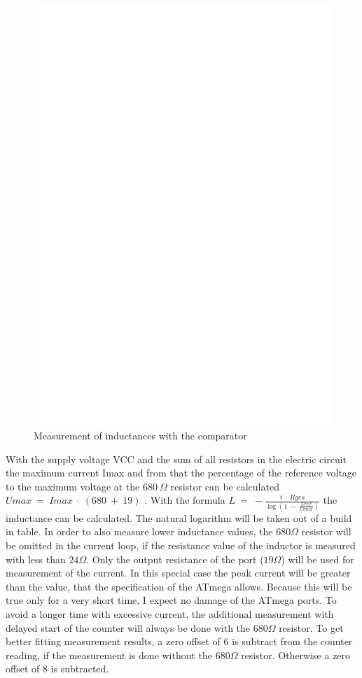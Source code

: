 \begin{figure}[H]
\centering
\includegraphics[]{../FIG/Inductance.eps}
\caption{Measurement of inductances with the comparator}
\label{fig:Inductance}
\end{figure}

With the supply voltage VCC and the sum of all resistors in the electric circuit the maximum current Imax and from
that the percentage of the reference voltage to the maximum voltage at the \(680~\Omega\) resistor can be calculated
\(Umax~=~Imax~\cdot~(680~+~19)\) .
With the formula \(L~=~-\frac{t~\cdot~Rges}{\log{(1~-~\frac{Uref}{Umax})}}\) the inductance can be calculated.
The natural logarithm will be taken out of a build in table.
In order to also measure lower inductance values, the \(680 \Omega\) resistor will be omitted in the current loop,
if the resistance value of the inductor is measured with less than \(24 \Omega\).
Only the output resistance of the port (\(19 \Omega\)) will be used for measurement of the current.
In this special case the peak current will be greater than the value, that the specification of the ATmega allows.
Because this will be true only for a very short time, I expect no damage of the ATmega ports.
To avoid a longer time with excessive current, the additional measurement with delayed start of the counter will always be
done with the \(680 \Omega\) resistor.
To get better fitting measurement results, a zero offset of 6 is subtract from the counter reading, 
if the measurement is done without the \(680 \Omega\) resistor. Otherwise a zero offset of 8 is subtracted.


